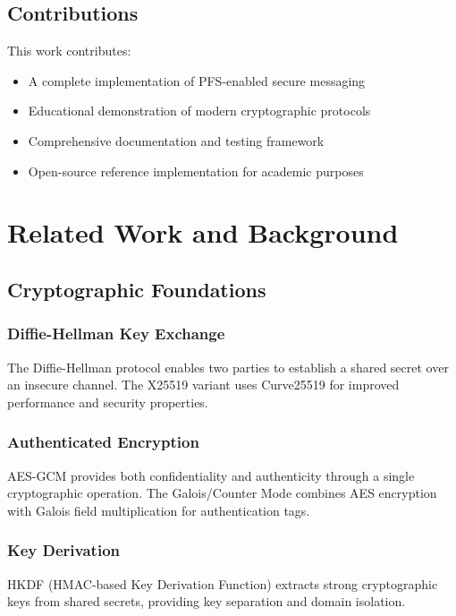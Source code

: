 \documentclass[conference]{IEEEtran}
\begin{document}
\subsection{Contributions}

This work contributes:

\begin{itemize}
    \item A complete implementation of PFS-enabled secure messaging
    \item Educational demonstration of modern cryptographic protocols
    \item Comprehensive documentation and testing framework
    \item Open-source reference implementation for academic purposes
\end{itemize}

\section{Related Work and Background}

\subsection{Cryptographic Foundations}

\subsubsection{Diffie-Hellman Key Exchange}
The Diffie-Hellman protocol \cite{diffie1976} enables two parties to establish a shared secret over an insecure channel. The X25519 variant \cite{bernstein2006} uses Curve25519 for improved performance and security properties.

\subsubsection{Authenticated Encryption}
AES-GCM \cite{mcgrew2004} provides both confidentiality and authenticity through a single cryptographic operation. The Galois/Counter Mode combines AES encryption with Galois field multiplication for authentication tags.

\subsubsection{Key Derivation}
HKDF (HMAC-based Key Derivation Function) \cite{krawczyk2010} extracts strong cryptographic keys from shared secrets, providing key separation and domain isolation.
\end{document}
